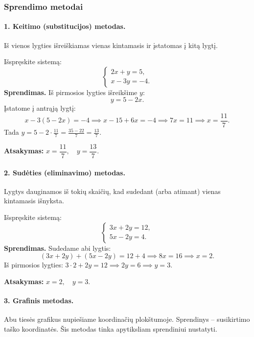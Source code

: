 \subsubsection*{Sprendimo metodai}

\paragraph{1. Keitimo (substitucijos) metodas.}
Iš vienos lygties išreiškiamas vienas kintamasis ir įstatomas į kitą lygtį.

\begin{example}
Išspręskite sistemą:
\[
  \begin{cases}
    2x + y = 5,\\
    x - 3y = -4.
  \end{cases}
\]
\textbf{Sprendimas.} Iš pirmosios lygties išreikšime $y$:
\[
  y = 5 - 2x.
\]
Įstatome į antrąją lygtį:
\[
  x - 3(5 - 2x) = -4 \implies x - 15 + 6x = -4 \implies 7x = 11 \implies x = \frac{11}{7}.
\]
Tada $y = 5 - 2 \cdot \frac{11}{7} = \frac{35 - 22}{7} = \frac{13}{7}$.

\textbf{Atsakymas:} $x = \dfrac{11}{7},\quad y = \dfrac{13}{7}$.
\end{example}

\paragraph{2. Sudėties (eliminavimo) metodas.}
Lygtys dauginamos iš tokių skaičių, kad sudedant (arba atimant) vienas kintamasis išnyksta.

\begin{example}
Išspręskite sistemą:
\[
  \begin{cases}
    3x + 2y = 12,\\
    5x - 2y = 4.
  \end{cases}
\]
\textbf{Sprendimas.} Sudedame abi lygtis:
\[
  (3x + 2y) + (5x - 2y) = 12 + 4 \implies 8x = 16 \implies x = 2.
\]
Iš pirmosios lygties: $3 \cdot 2 + 2y = 12 \implies 2y = 6 \implies y = 3$.

\textbf{Atsakymas:} $x = 2,\quad y = 3$.
\end{example}

\paragraph{3. Grafinis metodas.}
Abu tiesės grafikus nupiešiame koordinačių plokštumoje. Sprendinys -- susikirtimo taško koordinatės. Šis metodas tinka apytiksliam sprendiniui nustatyti.

